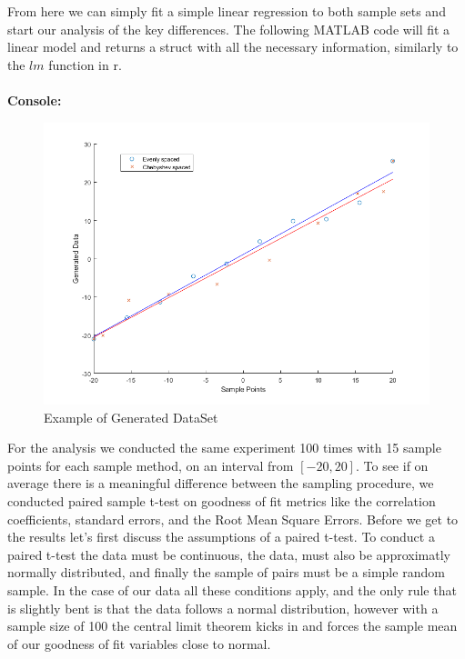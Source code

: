 \documentclass[12pt]{article}
\theoremstyle{homework}
\begin{document}
From here we can simply fit a simple linear regression to both sample sets and start our analysis of the key differences. The following MATLAB code
will fit a linear model and returns a struct with all the necessary information, similarly to the  $lm$ function in r.\\\\
\textbf{Console:}
\begin{center}

\end{center}

\begin{figure}[H]
  \caption{Example of Generated DataSet}
  \includegraphics[width = \textwidth]{Example_generated_data2.png}  
  \centering
\end{figure}



For the analysis we conducted the same experiment 100 times with 15 sample points for each sample method, on an interval from $[-20,20]$. To see if on average there is a meaningful difference between the sampling procedure, we conducted paired sample t-test on 
goodness of fit metrics like the correlation coefficients, standard errors, and the Root Mean Square Errors. Before we get to the results let's first discuss the assumptions of a paired t-test. To conduct a paired t-test the data must be continuous, 
the data, must also be approximatly normally distributed, and finally the sample of pairs must be a simple random sample. In the case of our data all these conditions apply, and the only rule that is slightly bent is that the 
data follows a normal distribution, however with a sample size of 100 the central limit theorem kicks in and forces the sample mean of our goodness of fit variables close to normal. 
\\\\
\end{document}
